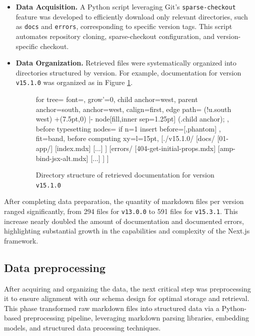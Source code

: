 \begin{itemize}
	\item \textbf{Data Acquisition.} A Python script leveraging Git's \texttt{sparse-checkout} feature was developed to efficiently download only relevant directories, such as \texttt{docs} and \texttt{errors}, corresponding to specific version tags. This script automates repository cloning, sparse-checkout configuration, and version-specific checkout.
	
	\item \textbf{Data Organization.} Retrieved files were systematically organized into directories structured by version. For example, documentation for version \texttt{v15.1.0} was organized as in Figure \ref{fig:v15dir}.
	
	\begin{figure}[H]
		\centering
		\begin{forest}
			for tree={
				font=\ttfamily,
				grow'=0,
				child anchor=west,
				parent anchor=south,
				anchor=west,
				calign=first,
				edge path={
					\noexpand{}
					(!u.south west) +(7.5pt,0) |- node[fill,inner sep=1.25pt] {} (.child anchor);
				},
				before typesetting nodes={
					if n=1
					{insert before={[,phantom]}}
					{}
				},
				fit=band,
				before computing xy={l=15pt},
			}
			[./v15.1.0/
			[docs/
			[01-app/]
			[index.mdx]
			[...]
			]
			[errors/
			[404-get-initial-props.mdx]
			[amp-bind-jsx-alt.mdx]
			[...]
			]
			]
		\end{forest}
		\vspace{5mm}
		\caption{Directory structure of retrieved documentation for version \texttt{v15.1.0}}
		\label{fig:v15dir}
	\end{figure}
	
\end{itemize}
	
After completing data preparation, the quantity of markdown files per version ranged significantly, from 294 files for \texttt{v13.0.0} to 591 files for \texttt{v15.3.1}. This increase nearly doubled the amount of documentation and documented errors, highlighting substantial growth in the capabilities and complexity of the Next.js framework.

\subsection{Data preprocessing} \label{sec:data_preprocessing}

After acquiring and organizing the data, the next critical step was preprocessing it to ensure alignment with our schema design for optimal storage and retrieval. This phase transformed raw markdown files into structured data via a Python-based preprocessing pipeline, leveraging markdown parsing libraries, embedding models, and structured data processing techniques.

